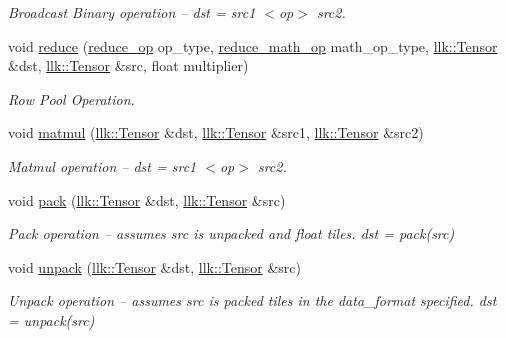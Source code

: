 \begin{DoxyCompactItemize}
\begin{DoxyCompactList}\small\item\em Broadcast Binary operation -- dst = src1 $<$op$>$ src2. \end{DoxyCompactList}\item 
void \hyperlink{namespacellk_1_1tensor__ops_a4804848e756700934cfe20be8565265c}{reduce} (\hyperlink{namespacellk_1_1tensor__ops_a57720b85adbe1e9b3bbab02b985f0d8d}{reduce\+\_\+op} op\+\_\+type, \hyperlink{namespacellk_1_1tensor__ops_abbf479560e4c31bec0b83feb6531552c}{reduce\+\_\+math\+\_\+op} math\+\_\+op\+\_\+type, \hyperlink{classllk_1_1Tensor}{llk\+::\+Tensor} \&dst, \hyperlink{classllk_1_1Tensor}{llk\+::\+Tensor} \&src, float multiplier)
\begin{DoxyCompactList}\small\item\em Row Pool Operation. \end{DoxyCompactList}\item 
void \hyperlink{namespacellk_1_1tensor__ops_adcbf09725b122e136e6fc4f90c34a909}{matmul} (\hyperlink{classllk_1_1Tensor}{llk\+::\+Tensor} \&dst, \hyperlink{classllk_1_1Tensor}{llk\+::\+Tensor} \&src1, \hyperlink{classllk_1_1Tensor}{llk\+::\+Tensor} \&src2)
\begin{DoxyCompactList}\small\item\em Matmul operation -- dst = src1 $<$op$>$ src2. \end{DoxyCompactList}\item 
void \hyperlink{namespacellk_1_1tensor__ops_ad76f0782652afbdf1f6032e44cae4288}{pack} (\hyperlink{classllk_1_1Tensor}{llk\+::\+Tensor} \&dst, \hyperlink{classllk_1_1Tensor}{llk\+::\+Tensor} \&src)
\begin{DoxyCompactList}\small\item\em Pack operation -- assumes src is unpacked and float tiles. dst = pack(src) \end{DoxyCompactList}\item 
void \hyperlink{namespacellk_1_1tensor__ops_a2aba5bcddb604c8d7fad329330782df4}{unpack} (\hyperlink{classllk_1_1Tensor}{llk\+::\+Tensor} \&dst, \hyperlink{classllk_1_1Tensor}{llk\+::\+Tensor} \&src)
\begin{DoxyCompactList}\small\item\em Unpack operation -- assumes src is packed tiles in the data\+\_\+format specified. dst = unpack(src) \end{DoxyCompactList}\end{DoxyCompactItemize}
